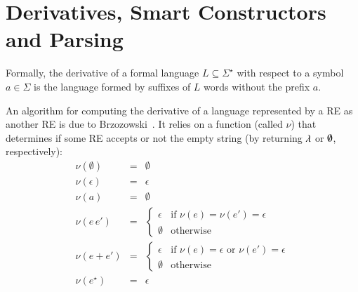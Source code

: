 \documentclass[review]{elsarticle}
\theoremstyle{definition}
\newcommand{\C}[1]{\red{\mathsf{#1}}}
\begin{document}
\section{Derivatives, Smart Constructors and Parsing}\label{sec:deriv}

Formally, the derivative of a formal language $L\subseteq
\Sigma^\star$ with respect to a symbol $a\in\Sigma$ is the language
formed by suffixes of $L$ words without the prefix $a$.

An algorithm for computing the derivative of a language represented by
a RE as another RE is due to Brzozowski~\cite{Brzozowski1964}. It
relies on a function (called $\nu$) that determines if some RE accepts
or not the empty string (by returning \ensuremath{\C{\lambda}} or \ensuremath{\C{\emptyset}}, respectively):
\[
    \begin{array}{lcl}
         \nu(\emptyset) & = & \emptyset \\
         \nu(\epsilon)    & = & \epsilon \\
         \nu(a)                & = & \emptyset \\
         \nu(e\,e')           & = & \left\{
                                                 \begin{array}{ll}
                                                      \epsilon &
                                                                 \text{if
                                                                 }\nu(e)
                                                                 =
                                                                 \nu(e')
                                                                 =
                                                                 \epsilon
                                                   \\
                                                   \emptyset &
                                                               \text{otherwise}
                                                 \end{array}
                                             \right. \\
         \nu(e + e')  & = & \left\{
                                         \begin{array}{ll}
                                              \epsilon & \text{if
                                                         }\nu(e) =
                                                         \epsilon
                                                         \text{ or
                                                         }\nu(e') =
                                                         \epsilon \\
                                              \emptyset & \text{otherwise}
                                         \end{array}
                                      \right. \\
         \nu(e^\star) & = & \epsilon
    \end{array}
\]
\end{document}

